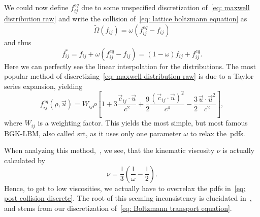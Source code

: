 We could now define $f_{ij}^{eq}$ due to some unspecified discretization of~\eqref{eq: maxwell distribution raw} and write the collision of~\eqref{eq: lattice boltzmann equation} as
\begin{equation}
  \tilde{\Omega}(f_{ij}) = \omega \left(f_{ij}^{eq} - f_{ij}\right)
\end{equation}
and thus
\begin{equation}
  \label{eq: post collision discrete}
  f_{ij}^* = f_{ij} + \omega \left(f_{ij}^{eq} - f_{ij}\right) = (1-\omega)f_{ij} + f_{ij}^{eq}.
\end{equation}
Here we can perfectly see the linear interpolation for the distributions.
The most popular method of discretizing~\eqref{eq: maxwell distribution raw} is due to a Taylor series expansion, yielding
\begin{equation}
  f_{ij}^{eq}(\rho,\vec{u}) = W_{ij}\rho
  \left[
    1
    + 3\frac{\vec{c}_{ij} \cdot \vec{u}}{c^2}
    + \frac{9}{2}\frac{{(\vec{c}_{ij} \cdot \vec{u})}^2}{c^4}
    - \frac{3}{2}\frac{\vec{u} \cdot \vec{u}^2}{c^2}
  \right],
\end{equation}
where $W_{ij}$ is a weighting factor.
This yields the most simple, but most famous BGK-LBM, also called \gls{srt}, as it uses only one parameter $\omega$ to relax the~\glspl{pdf}.

When analyzing this method,~\cite[Section 5.2.3]{wolf2000lattice}, we see, that the kinematic viscosity $\nu$ is actually calculated by
\begin{equation}
  \nu = \frac{1}{3}\left(\frac{1}{\omega} - \frac{1}{2}\right).
\end{equation}
Hence, to get to low viscosities, we actually have to overrelax the \glspl{pdf} in~\eqref{eq: post collision discrete}.
The root of this seeming inconsistency is elucidated in~\cite[Section 4]{karlin2006elements}, and stems from our discretization of~\eqref{eq: Boltzmann transport equation}.

